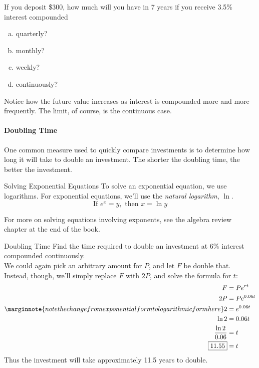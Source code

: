 \begin{try}
If you deposit \$300, how much will you have in 7 years if you receive 3.5\% interest compounded
\begin{enumerate}[(a)]
\item quarterly?
\item monthly?
\item weekly?
\item continuously?
\end{enumerate}
\end{try}

Notice how the future value increases as interest is compounded more and more frequently.  The limit, of course, is the continuous case.
\pagebreak

\paragraph{Doubling Time} One common measure used to quickly compare investments is to determine how long it will take to double an investment.  The shorter the doubling time, the better the investment.

\begin{proc}{Solving Exponential Equations}
To solve an exponential equation, we use logarithms.  For exponential equations, we'll use the \textit{natural logarithm}, $\ln$.
\[\textrm{If } e^x = y, \textrm{ then } x = \ln y\]
\end{proc}

For more on solving equations involving exponents, see the algebra review chapter at the end of the book.

\begin{example}[https://www.youtube.com/watch?v=WKByWayHv00&list=PLfmpjsIzhztsZtnb7HnXrQ8SLoiOCIcAM&index=23]{Doubling Time}
Find the time required to double an investment at 6\% interest compounded continuously.\\

\sol
We could again pick an arbitrary amount for $P$, and let $F$ be double that.  Instead, though, we'll simply replace $F$ with $2P$, and solve the formula for $t$:
\begin{align*}
F &= Pe^{rt}\\
2P &= Pe^{0.06t}\\
\marginnote{note the change from exponential form to logarithmic form here}
2 &= e^{0.06t}\\
\ln 2 &= 0.06t\\
\dfrac{\ln 2}{0.06} &= t\\
\boxed{11.55} &= t
\end{align*}
Thus the investment will take approximately 11.5 years to double.
\end{example}

